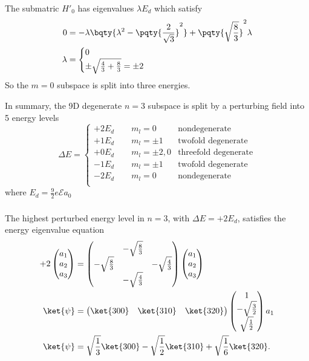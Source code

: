 \documentclass[12pt]{article}
\begin{document}
        The submatric \(H'_0\) has eigenvalues \(\lambda E_d\) which satisfy \begin{align*}
            0 &= - \lambda\bqty{\lambda^2 - \pqty{\frac{2}{\sqrt{3}}}^2} + \pqty{\sqrt{\frac{8}{3}}}^2 \lambda\\
            \lambda &= \begin{cases}
                0\\
                \pm \sqrt{\frac{4}{3} + \frac{8}{3}} =\pm 2
            \end{cases}
        \end{align*}
        So the \(m = 0\) subspace is split into three energies.

        In summary, the 9D degenerate \(n = 3\) subspace is split by a perturbing field into 5 energy levels \[
            \Delta  E = \begin{cases}
                + 2 E_d \qquad m_l = 0&\text{nondegenerate}\\
                + 1 E_d \qquad m_l =\pm 1&\text{twofold degenerate}\\
                + 0E_d\qquad m_l = \pm 2, 0 &\text{threefold degenerate}\\
                - 1 E_d \qquad m_l =\pm 1&\text{twofold degenerate}\\
                - 2 E_d \qquad m_l = 0&\text{nondegenerate}\\
            \end{cases}
        \]
        where \(E_d = \frac{9}{2} e \mathcal{E}a_0\) 
        \subsubsection{} The highest perturbed energy level in \(n = 3\), with \(\Delta E = + 2 E_d\), satisfies the energy eigenvalue equation \begin{align*}
            + 2 \begin{pmatrix} a_1\\ a_2\\a_3 \end{pmatrix} &= \begin{pmatrix} &-\sqrt{\frac{8}{3}}&\\ -\sqrt{\frac{8}{3}}&& -\sqrt{\frac{4}{3}}\\& - \sqrt{\frac{4}{3}} \end{pmatrix} \begin{pmatrix} a_1\\a_2\\a_3 \end{pmatrix} \\
            \ket{\psi} &= \begin{pmatrix} \ket{300} &\ket{310} &\ket{320}  \end{pmatrix}  \begin{pmatrix} 1\\- \sqrt{\frac{3}{2}}\\ \sqrt{\frac{1}{2}} \end{pmatrix} a_1\\
            \ket{\psi} &= \sqrt{\frac{1}{3}} \ket{300} - \sqrt{\frac{1}{2}} \ket{310} + \sqrt{\frac{1}{6}} \ket{320} .
        \end{align*}
\end{document}
